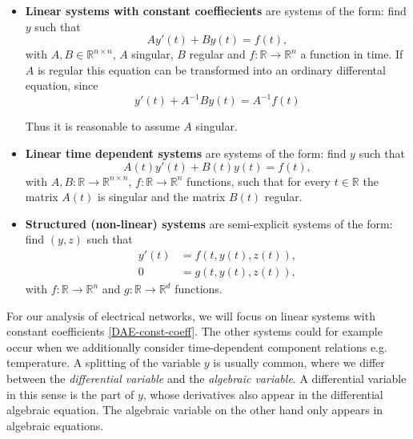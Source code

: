 	\begin{itemize}
		\item \textbf{Linear systems with constant coeffiecients} \newline
		are systems of the form: find $y$ such that
		\begin{equation}
			\label{DAE-const-coeff}
			A y'(t) + B y(t) = f(t) ,
		\end{equation}
		with $A,B \in \mathbb{R}^{n \times n}$, $A$ singular, $B$ regular and $f:\mathbb{R} \to \mathbb{R}^n$ a function in time. If $A$ is regular this equation can be transformed into an ordinary differental equation, since
		\begin{displaymath}
			y'(t) + A^{-1}By(t) = A^{-1} f(t)
		\end{displaymath}
		
		Thus it is reasonable to assume $A$ singular.
		
		\item \textbf{Linear time dependent systems}
		are systems of the form: find $y$ such that
		\begin{displaymath}
			A(t) y'(t) + B(t) y(t) = f(t) ,
		\end{displaymath}
		with $A, B:\mathbb{R} \to \mathbb{R}^{n \times n}$, $f:\mathbb{R} \to \mathbb{R}^n$ functions, such that for every $t \in \mathbb{R}$ the matrix $A(t)$ is singular and the matrix $B(t)$ regular.
		
		\item  \textbf{Structured (non-linear) systems} \newline
		are semi-explicit systems of the form: find $(y,z)$ such that
		\begin{align*}
			y'(t) &= f(t, y(t), z(t)) , \\
			0 &= g(t,y(t),z(t)) ,
		\end{align*}
		with $f:\mathbb{R} \to \mathbb{R}^n$ and $g:\mathbb{R} \to \mathbb{R}^d$ functions.
	\end{itemize}
	
	For our analysis of electrical networks, we will focus on linear systems with constant coefficients \eqref{DAE-const-coeff}. The other systems could for example occur when we additionally consider time-dependent component relations e.g. temperature. 
	A splitting of the variable $y$ is usually common, where we differ between the \emph{differential variable} and the \emph{algebraic variable}. A differential variable in this sense is the part of $y$, whose derivatives also appear in the differential algebraic equation. The algebraic variable on the other hand only appears in algebraic equations.

